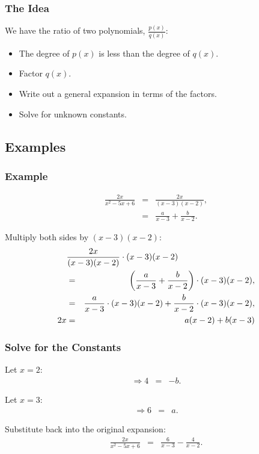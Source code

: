 \begin{frame}
  \frametitle{The Idea}

  We have the ratio of two polynomials, $\frac{p(x)}{q(x)}$:
  \begin{itemize}
  \item The degree of $p(x)$ is less than the degree of $q(x)$.
  \item Factor $q(x)$.
  \item Write out a general expansion in terms of the factors.
  \item Solve for unknown constants.
  \end{itemize}

\end{frame}

\subsection{Examples}

\begin{frame}
  \frametitle{Example}

  \begin{eqnarray*}
    \frac{2x}{x^2-5x+6} & = & \frac{2x}{(x-3)(x-2)}, \\
      & = & \frac{a}{x-3} + \frac{b}{x-2}.
  \end{eqnarray*}

  Multiply both sides by $(x-3)(x-2)$:
  \begin{eqnarray*}
    \lefteqn{\frac{2x}{(x-3)(x-2)} \cdot (x-3)(x-2)  } \\
      & = & \lp \frac{a}{x-3} + \frac{b}{x-2} \rp \cdot (x-3)(x-2), \\
      & = &  \frac{a}{x-3} \cdot (x-3)(x-2) + \frac{b}{x-2} \cdot (x-3)(x-2), \\
      2x & = & a (x-2) + b(x-3)
  \end{eqnarray*}


\end{frame}


\begin{frame}
  \frametitle{Solve for the Constants}

  Let $x=2$:
  \begin{eqnarray*}
    \Rightarrow 4 & = & -b.
  \end{eqnarray*}

  Let $x=3$:
  \begin{eqnarray*}
    \Rightarrow 6 & = & a.
  \end{eqnarray*}

  Substitute back into the original expansion:
  \begin{eqnarray*}
    \frac{2x}{x^2-5x+6} & = & \frac{6}{x-3} - \frac{4}{x-2}.
  \end{eqnarray*}

\end{frame}


